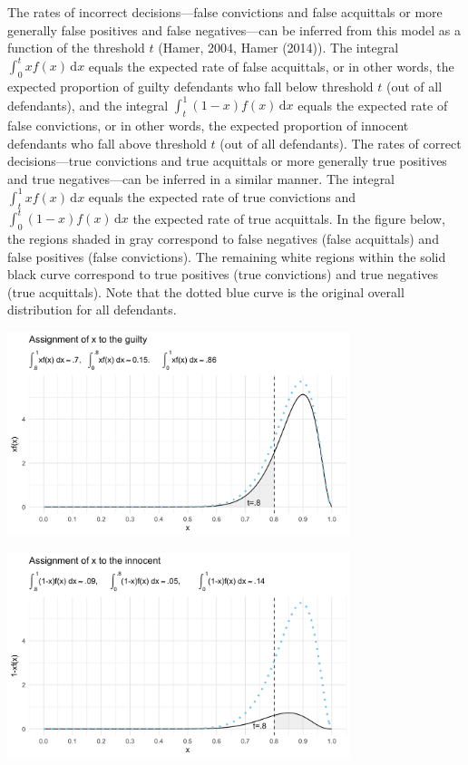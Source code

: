 \documentclass[10pt,dvipsnames]{scrartcl}
\begin{document}
The rates of incorrect decisions---false convictions and false
acquittals or more generally false positives and false negatives---can
be inferred from this model as a function of the threshold \(t\) (Hamer,
2004, Hamer (2014)). The integral \(\int_0^t \! xf(x) \, \mathrm{d}x\)
equals the expected rate of false acquittals, or in other words, the
expected proportion of guilty defendants who fall below threshold \(t\)
(out of all defendants), and the integral
\(\int_t^1 \! (1-x)f(x) \, \mathrm{d}x\) equals the expected rate of
false convictions, or in other words, the expected proportion of
innocent defendants who fall above threshold \(t\) (out of all
defendants). The rates of correct decisions---true convictions and true
acquittals or more generally true positives and true negatives---can be
inferred in a similar manner. The integral
\(\int_t^1 \! xf(x) \, \mathrm{d}x\) equals the expected rate of true
convictions and \(\int_0^t \! (1-x)f(x) \, \mathrm{d}x\) the expected
rate of true acquittals. In the figure below, the regions shaded in gray
correspond to false negatives (false acquittals) and false positives
(false convictions). The remaining white regions within the solid black
curve correspond to true positives (true convictions) and true negatives
(true acquittals). Note that the dotted blue curve is the original
overall distribution for all defendants.

\begin{center}
    \includegraphics[width=10cm]{xfx3.png}
\end{center}

\begin{center}
    \includegraphics[width=10cm]{nxfx3.png}
\end{center}
\end{document}
